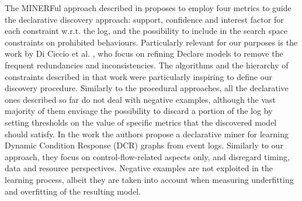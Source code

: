The MINERFul approach described in \cite{2015-DiCiccio} proposes to employ four metrics to guide the declarative discovery approach: support, confidence and interest factor for each constraint w.r.t. the log, and the possibility to include in the search space constraints on prohibited behaviours.
Particularly relevant for our purposes is the work by Di Ciccio et al. \cite{2017-DiCiccio}, who focus on refining Declare models to remove the frequent redundancies and inconsistencies. The algorithms and the hierarchy of constraints described in that work were particularly inspiring to define our discovery procedure.
Similarly to the procedural approaches, all the declarative ones described so far do not deal with negative examples, although the vast majority of them envisage the possibility to discard a portion of the log by setting thresholds on the value of specific metrics that the discovered model should satisfy.
In the work \cite{2021-Back}  the authors propose a declarative miner for learning Dynamic Condition Response (DCR) graphs from event logs. Similarly to our approach, they focus on control-flow-related aspects only, and disregard timing, data and resource perspectives. Negative examples are not exploited in the learning process, albeit they are taken into account when measuring underfitting and overfitting of the resulting model.


